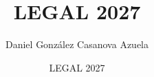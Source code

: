 \documentclass{beamer}
\title{LEGAL 2027}
\author{Daniel González Casanova Azuela}
\institute{PUC-Rio}
\date{LEGAL 2027}
\begin{document}
\begin{frame}%
\titlepage
\end{frame}
\end{document}
